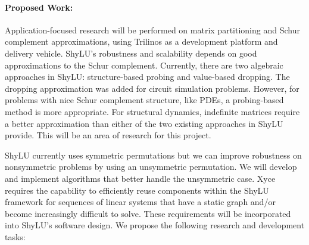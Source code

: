 \documentclass[10pt]{amsart}
\begin{document}
\paragraph{\bf Proposed Work:}
Application-focused research will be performed on matrix partitioning and
Schur complement approximations, using Trilinos as a development platform
and delivery vehicle.
ShyLU's robustness and scalability depends on good
approximations to the Schur complement. Currently, there
are two algebraic approaches in ShyLU: 
structure-based probing and value-based dropping. The dropping approximation
was added for circuit simulation problems. However, for problems
with nice Schur complement structure, like PDEs,
a probing-based method is more appropriate. 
For structural dynamics, indefinite matrices require a better 
approximation than either of the two existing approaches in ShyLU provide.
This will be an area of research for this project.

ShyLU currently uses symmetric permutations but we can improve robustness on
nonsymmetric problems by using an unsymmetric permutation.
We will develop and implement algorithms that better handle
the unsymmetric case.
Xyce requires the capability to efficiently
reuse components within the ShyLU framework for sequences of linear systems that
have a static graph and/or become increasingly difficult to solve.
These requirements will be incorporated into ShyLU's software design.
We propose the following research and development tasks:
\end{document}
